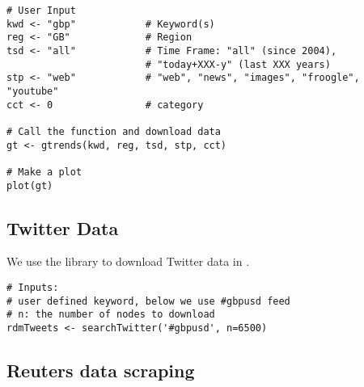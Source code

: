 \documentclass[12pt]{article}
\begin{document}
\begin{lstlisting}[title=\textbf{Google Trends Download.}]
# User Input
kwd <- "gbp"         	# Keyword(s)
reg <- "GB"             # Region
tsd <- "all"            # Time Frame: "all" (since 2004),
                        # "today+XXX-y" (last XXX years)
stp <- "web"            # "web", "news", "images", "froogle", "youtube"
cct <- 0                # category

# Call the function and download data
gt <- gtrends(kwd, reg, tsd, stp, cct)

# Make a plot
plot(gt)
\end{lstlisting}

\subsection{Twitter Data \textendash{} {\href{https://github.com/eurostat/econowcast/blob/master/extract/Twitter.R}{}}}

We use the  library to download Twitter data in .

\begin{lstlisting}[title=\textbf{Twitter data fetching.}]
# Inputs: 
# user defined keyword, below we use #gbpusd feed
# n: the number of nodes to download
rdmTweets <- searchTwitter('#gbpusd', n=6500)
\end{lstlisting}

\subsection{Reuters data scraping \textendash{} {\href{https://github.com/eurostat/econowcast/blob/master/extract/Reuters.py}{}}}
\end{document}
